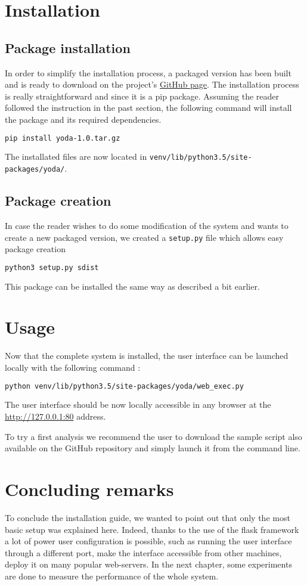 \section{Installation}
\subsection{Package installation}
In order to simplify the installation process, a packaged version has been built and is ready to download on the project's \href{https://github.com/dchenaux/Yoda}{GitHub page}. The installation process is really straightforward and since it is a \gls{pip} package. Assuming the reader followed the instruction in the past section, the following command will install the package and its required dependencies. 
\smallskip
\begin{lstlisting}[language=bash]
pip install yoda-1.0.tar.gz
\end{lstlisting}

The installated files are now located in \texttt{venv/lib/python3.5/site-packages/yoda/}.

\subsection{Package creation}
In case the reader wishes to do some modification of the system and wants to create a new packaged version, we created a \texttt{setup.py} file which allows easy package creation
\smallskip
\begin{lstlisting}[language=bash]
python3 setup.py sdist
\end{lstlisting}

This package can be installed the same way as described a bit earlier.

\section{Usage}
Now that the complete system is installed, the user interface can be launched locally with the following command :
\smallskip
\begin{lstlisting}[language=bash]
python venv/lib/python3.5/site-packages/yoda/web_exec.py
\end{lstlisting}
The user interface should be now locally accessible in any browser at the \url{http://127.0.0.1:80} address.

To try a first analysis we recommend the user to download the sample script also available on the GitHub repository and simply launch it from the command line.

\section{Concluding remarks}
To conclude the installation guide, we wanted to point out that only the most basic setup was explained here. Indeed, thanks to the use of the flask framework a lot of power user configuration is possible, such as running the user interface through a different port, make the interface accessible from other machines, deploy it on many popular web-servers. In the next chapter, some experiments are done to measure the performance of the whole system.
